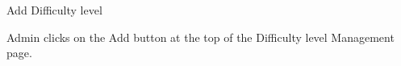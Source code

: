 
\begin{uc}{Add Difficulty level}


    \begin{uc-trig}
        Admin clicks on the Add button at the top of the Difficulty level Management
        page.
    \end{uc-trig}

\end{uc}


